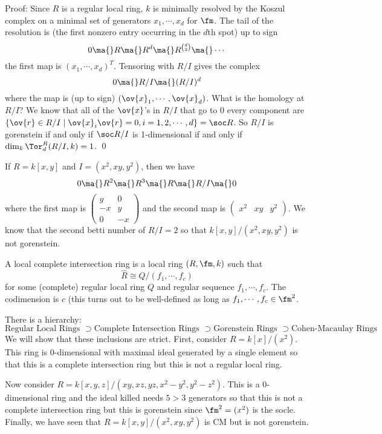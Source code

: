 \noindent Proof: Since $R$ is a regular local ring, $k$ is minimally resolved by the Koszul complex on a minimal set of generators $x_1,\cdots,x_d$ for $\fm$. The tail of the resolution is (the first nonzero entry occurring in the $d$th spot) up to sign
\[
0 \ma{} R \ma{} R^d \ma{} R^{\binom{d}{2}} \ma{} \cdots
\]
the first map is $(x_1,\cdots,x_d)^T$. Tensoring with $R/I$ gives the complex
\[
0 \ma{} R/I \ma{} (R/I)^d
\]
where the map is (up to sign) $(\ov{x}_1,\cdots,\ov{x}_d)$. What is the homology at $R/I$? We know that all of the $\ov{x}$'s in $R/I$ that go to 0 every component are $\{\ov{r} \in R/I \;|\; \ov{x}_i \ov{r} =0, i=1,2,\cdots,d\}=\soc R$. So $R/I$ is gorenstein if and only if $\soc R/I$ is 1-dimensional if and only if $\dim_k \Tor_d^R(R/I,k)=1$. \qed \\

\begin{ex}
If $R=k[x,y]$ and $I=(x^2,xy,y^2)$, then we have
\[
0 \ma{} R^2 \ma{} R^3 \ma{} R \ma{} R/I \ma{} 0
\]
where the first map is $\begin{pmatrix} y & 0 \\ -x & y \\ 0 & -x \end{pmatrix}$ and the second map is $\begin{pmatrix} x^2 & xy & y^2 \end{pmatrix}$. We know that the second betti number of $R/I=2$ so that $k[x,y]/(x^2,xy,y^2)$ is not gorenstein. 
\end{ex}

\begin{dfn}
A local complete intersection ring is a local ring $(R,\fm,k)$ such that
\[
\hat{R} \cong Q/(f_1,\cdots,f_c)
\]
for some (complete) regular local ring $Q$ and regular sequence $f_1,\cdots,f_c$. The codimension is $c$ (this turns out to be well-defined as long as $f_1,\cdots,f_c \in \fm^2$. 
\end{dfn}

\begin{rem}
There is a hierarchy:
\[
\text{Regular Local Rings } \supset \text{Complete Intersection Rings } \supset \text{Gorenstein Rings } \supset  \text{Cohen-Macaulay Rings}
\] We will show that these inclusions are strict. First, consider $R=k[x]/(x^2)$. This ring is 0-dimensional with maximal ideal generated by a single element so that this is a complete intersection ring but this is not a regular local ring. 

Now consider $R=k[x,y,z]/(xy,xz,yz,x^2-y^2,y^2-z^2)$. This is a 0-dimensional ring and the ideal killed needs $5>3$ generators so that this is not a complete intersection ring but this is gorenstein since $\fm^2=(x^2)$ is the socle. Finally, we have seen that $R=k[x,y]/(x^2,xy,y^2)$ is CM but is not gorenstein. 
\end{rem}


